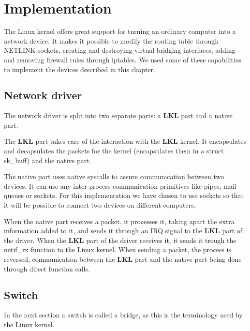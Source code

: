 \chapter{Implementation}
\label{chapter:impl}

The Linux kernel offers great support for turning an ordinary
computer into a network device. It makes it possible to modify the routing 
table through NETLINK sockets, creating and destroying virtual 
bridging interfaces, adding and removing firewall rules through 
iptables. We used some of these capabilities to implement the 
devices described in this chapter.

\section{Network driver}
\label{sec:net-driver}


The network driver is split into two separate parts: a \textbf{LKL} part 
and a native part.

The \textbf{LKL} part takes care of the interaction with the \textbf{LKL} kernel.
It encapsulates and decapsulates the packets for the kernel
(encapsulates them in a struct sk_buff) and the native part.

The native part uses native syscalls to assure communication 
between two devices. It can use any inter-process communication 
primitives like pipes, mail queues or sockets.
For this implementation we have chosen to use 
sockets so that it will be possible to connect two devices 
on different computers.

When the native part receives a packet, it processes it, taking apart
the extra information added to it,  and sends it through an IRQ signal
to the \textbf{LKL} part of the driver. When the \textbf{LKL} part of the driver receives it,
it sends it trough the netif_rx function to the Linux kernel. When sending
a packet, the process is reversed, communication between the \textbf{LKL} part and the
native part being done through direct function calls.

\section{Switch}
\label{sec:switch-impl}

In the next section a switch is called a bridge, as this is the terminology used by the Linux kernel.

